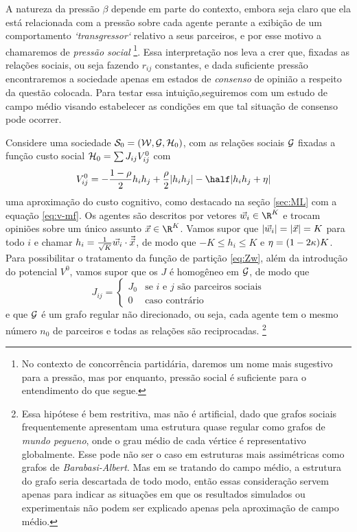 A natureza da pressão $\beta$ depende em parte do contexto, embora
seja claro que ela está relacionada com a pressão sobre cada agente
perante a exibição de um comportamento \emph{`transgressor`} relativo
a seus parceiros, e por esse motivo a chamaremos de \emph{pressão social}
\footnote{No contexto de concorrência partidária, daremos um nome mais
  sugestivo para a pressão, mas por enquanto, pressão social é
  suficiente para o entendimento do que segue.}.  Essa interpretação
nos leva a crer que, fixadas as relações sociais, ou seja fazendo
$r_{ij}$ constantes, e dada suficiente pressão encontraremos a
sociedade apenas em estados de \emph{consenso} de opinião a respeito
da questão colocada. Para testar essa intuição,seguiremos com um estudo
de campo médio visando estabelecer as condições em que tal situação de 
consenso pode ocorrer.

\newcommand{\qst}{\ensuremath{\vec{x}}}
\newcommand{\cutoff}{\ensuremath{\eta}}
Considere uma sociedade $\mathcal{S}_0=(\mathcal{W},\mathcal{G},{\mathcal{H}}_0)$, com as
relações sociais $\mathcal{G}$ fixadas a função custo social 
${\mathcal{H}}_0 = \sum J_{ij} V^0_{ij}$ com
\begin{align}\label{eq:V0ij}
  V^0_{ij} & = -\frac{1-\rho}{2}h_ih_j +\frac{\rho}{2}|h_ih_j| 
               - \half|h_ih_j + \cutoff|
\end{align}
uma aproximação do custo cognitivo, como destacado na seção
\ref{sec:ML} com a equação \eqref{eq:v-mf}. Os agentes são descritos
por vetores $\agt{i}\in\R^K$ e trocam opiniões sobre um único assunto
$\qst\in\R^K$. Vamos supor que $|\agt{i}|=|\qst|=K$ para todo $i$ e
chamar $h_i = \opn{i}{\qst}$, de modo que $-K \leq h_i \leq K$ e
$\cutoff = (1-2\ns)K$.  Para possibilitar o tratamento da função de
partição \eqref{eq:Zw}, além da introdução do potencial $V^0$, vamos
supor que os $J$ é homogêneo em $\mathcal{G}$, de modo que
\begin{equation*}
  J_{ij} = \begin{cases}
    J_0 & \text{se $i$ e $j$ são parceiros sociais} \\
    0 & \text{caso contrário}
    \end{cases}
\end{equation*}
e que $\mathcal{G}$ é um grafo regular não direcionado, ou seja, cada agente
tem o mesmo número $n_0$ de parceiros e todas as relações são
reciprocadas. \footnote{Essa hipótese é bem restritiva, mas não é
  artificial, dado que grafos sociais frequentemente apresentam uma
  estrutura quase regular como grafos de \emph{mundo pegueno}, onde o
  grau médio de cada vértice é representativo globalmente. Esse pode
  não ser o caso em estruturas mais assimétricas como grafos de
  \emph{Barabasi-Albert}.  Mas em se tratando do campo médio, a
  estrutura do grafo seria descartada de todo modo, então essas
  consideração servem apenas para indicar as situações em que os
  resultados simulados ou experimentais não podem ser explicado apenas
  pela aproximação de campo médio.}

